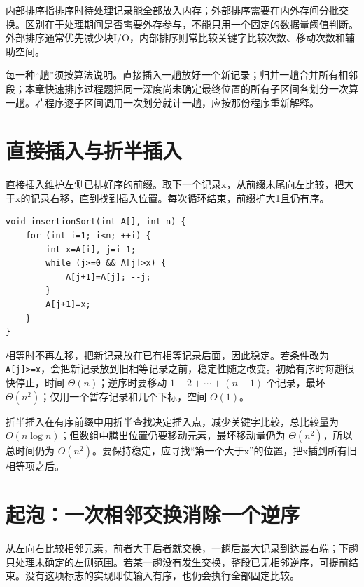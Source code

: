 内部排序指排序时待处理记录能全部放入内存；外部排序需要在内外存间分批交换。区别在于处理期间是否需要外存参与，不能只用一个固定的数据量阈值判断。外部排序通常优先减少块I/O，内部排序则常比较关键字比较次数、移动次数和辅助空间。

每一种``趟''须按算法说明。直接插入一趟放好一个新记录；归并一趟合并所有相邻段；本章快速排序过程题把同一深度尚未确定最终位置的所有子区间各划分一次算一趟。若程序逐子区间调用一次划分就计一趟，应按那份程序重新解释。

\section{直接插入与折半插入}\label{ds-08-02}

直接插入维护左侧已排好序的前缀。取下一个记录x，从前缀末尾向左比较，把大于x的记录右移，直到找到插入位置。每次循环结束，前缀扩大1且仍有序。

\par\medskip\noindent
\begin{minipage}{\linewidth}
\begin{verbatim}
void insertionSort(int A[], int n) {
    for (int i=1; i<n; ++i) {
        int x=A[i], j=i-1;
        while (j>=0 && A[j]>x) {
            A[j+1]=A[j]; --j;
        }
        A[j+1]=x;
    }
}
\end{verbatim}
\end{minipage}\par\medskip

相等时不再左移，把新记录放在已有相等记录后面，因此稳定。若条件改为 \allowbreak{}\texttt{A{[}j{]}\textgreater{}=x}，会把新记录放到旧相等记录之前，稳定性随之改变。初始有序时每趟很快停止，时间 \(\Theta(n)\)；逆序时要移动 \(1+2+\cdots+(n-1)\) 个记录，最坏 \(\Theta(n^2)\)；仅用一个暂存记录和几个下标，空间 \(O(1)\)。

折半插入在有序前缀中用折半查找决定插入点，减少关键字比较，总比较量为 \(O(n\log n)\)；但数组中腾出位置仍要移动元素，最坏移动量仍为 \(\Theta(n^2)\)，所以总时间仍为 \(O(n^2)\)。要保持稳定，应寻找``第一个大于x''的位置，把x插到所有旧相等项之后。

\section{起泡：一次相邻交换消除一个逆序}\label{ds-08-03}

从左向右比较相邻元素，前者大于后者就交换，一趟后最大记录到达最右端；下趟只处理未确定的左侧范围。若某一趟没有发生交换，整段已无相邻逆序，可提前结束。没有这项标志的实现即使输入有序，也仍会执行全部固定比较。

